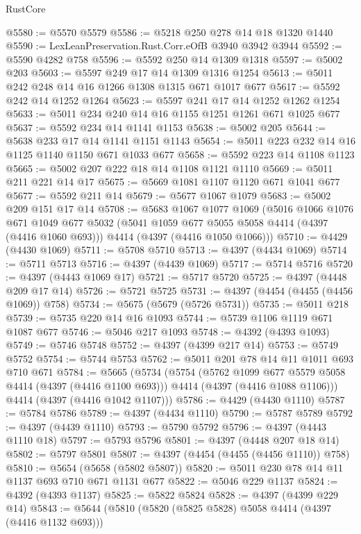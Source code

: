 \begin{lexlean}{RustCore}
\begin{coremodule}
@5580 := @5570 @5579
@5586 := @5218 @250 @278 @14 @18 @1320 @1440
@5590 := LexLeanPreservation.Rust.Corr.eOfB @3940 @3942 @3944
@5592 := @5590 @4282 @758
@5596 := @5592 @250 @14 @1309 @1318
@5597 := @5002 @203
@5603 := @5597 @249 @17 @14 @1309 @1316 @1254
@5613 := @5011 @242 @248 @14 @16 @1266 @1308 @1315 @671 @1017 @677
@5617 := @5592 @242 @14 @1252 @1264
@5623 := @5597 @241 @17 @14 @1252 @1262 @1254
@5633 := @5011 @234 @240 @14 @16 @1155 @1251 @1261 @671 @1025 @677
@5637 := @5592 @234 @14 @1141 @1153
@5638 := @5002 @205
@5644 := @5638 @233 @17 @14 @1141 @1151 @1143
@5654 := @5011 @223 @232 @14 @16 @1125 @1140 @1150 @671 @1033 @677
@5658 := @5592 @223 @14 @1108 @1123
@5665 := @5002 @207 @222 @18 @14 @1108 @1121 @1110
@5669 := @5011 @211 @221 @14 @17
@5675 := @5669 @1081 @1107 @1120 @671 @1041 @677
@5677 := @5592 @211 @14
@5679 := @5677 @1067 @1079
@5683 := @5002 @209 @151 @17 @14
@5708 := @5683
    @1067
    @1077
    @1069
    (@5016
      @1066
      @1076
      @671
      @1049
      @677
      @5032
      (@5041 @1059 @677 @5055 @5058 @4414 (@4397 (@4416 @1060 @693)))
      @4414
      (@4397 (@4416 @1050 @1066)))
@5710 := @4429 (@4430 @1069)
@5711 := @5708 @5710
@5713 := @4397 (@4434 @1069)
@5714 := @5711 @5713
@5716 := @4397 (@4439 @1069)
@5717 := @5714 @5716
@5720 := @4397 (@4443 @1069 @17)
@5721 := @5717 @5720
@5725 := @4397 (@4448 @209 @17 @14)
@5726 := @5721 @5725
@5731 := @4397 (@4454 (@4455 (@4456 @1069)) @758)
@5734 := @5675 (@5679 (@5726 @5731))
@5735 := @5011 @218
@5739 := @5735 @220 @14 @16 @1093
@5744 := @5739 @1106 @1119 @671 @1087 @677
@5746 := @5046 @217 @1093
@5748 := @4392 (@4393 @1093)
@5749 := @5746 @5748
@5752 := @4397 (@4399 @217 @14)
@5753 := @5749 @5752
@5754 := @5744 @5753
@5762 := @5011 @201 @78 @14 @11 @1011 @693 @710 @671
@5784 := @5665
    (@5734
      (@5754
        (@5762 @1099 @677 @5579 @5058 @4414 (@4397 (@4416 @1100 @693)))
        @4414
        (@4397 (@4416 @1088 @1106)))
      @4414
      (@4397 (@4416 @1042 @1107)))
@5786 := @4429 (@4430 @1110)
@5787 := @5784 @5786
@5789 := @4397 (@4434 @1110)
@5790 := @5787 @5789
@5792 := @4397 (@4439 @1110)
@5793 := @5790 @5792
@5796 := @4397 (@4443 @1110 @18)
@5797 := @5793 @5796
@5801 := @4397 (@4448 @207 @18 @14)
@5802 := @5797 @5801
@5807 := @4397 (@4454 (@4455 (@4456 @1110)) @758)
@5810 := @5654 (@5658 (@5802 @5807))
@5820 := @5011 @230 @78 @14 @11 @1137 @693 @710 @671 @1131 @677
@5822 := @5046 @229 @1137
@5824 := @4392 (@4393 @1137)
@5825 := @5822 @5824
@5828 := @4397 (@4399 @229 @14)
@5843 := @5644
    (@5810
      (@5820 (@5825 @5828) @5058 @4414 (@4397 (@4416 @1132 @693)))

\end{coremodule}
\end{lexlean}
